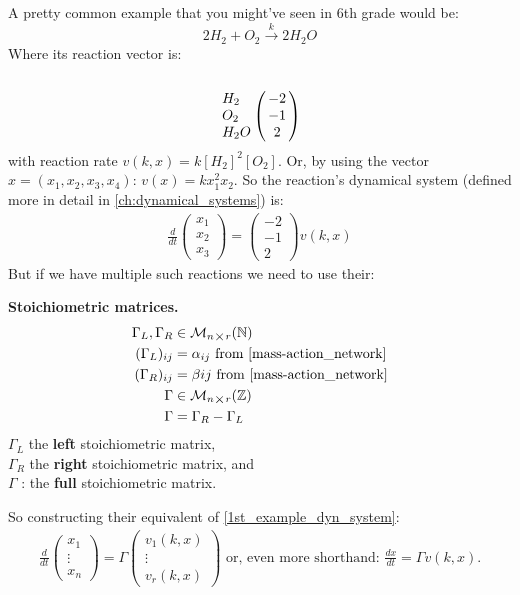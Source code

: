 A pretty common example that you might've seen in 6th grade would be:
\[
	2H_2 + O_2 \xrightarrow{k} 2H_2O
\]
Where its reaction vector is:
\[
	\bordermatrix{\cr \cr
		H_2 & -2 \cr
		O_2 & -1 \cr
		H_2O & 2 \cr
	}
\]
with reaction rate $v(k,x) = k[H_2]^2[O_2]$. Or, by using the vector $x=(x_1, x_2, x_3, x_4)$: $v(x) = k x_1^2 x_2$.
So the reaction's dynamical system (defined more in detail in \ref{ch:dynamical_systems}) is:
\begin{align}\label{1st_example_dyn_system}
	\frac{d}{dt}
	\begin{pmatrix*}
		x_1 \\
		x_2 \\
		x_3
	\end{pmatrix*} =
	\begin{pmatrix}
		-2 \\
		-1 \\
		2
	\end{pmatrix}
	v(k,x)
\end{align}
But if we have multiple such reactions we need to use their:
\begin{definition}
	\textbf{Stoichiometric matrices.}
	\begin{align*}
		\Gamma_L, \Gamma_R &\in \mathcal{M}_{n \bigtimes r}(\mathbb{N}) \\
		(\Gamma_L)_{ij} &= \alpha_{ij} \text{ from \ref{mass-action_network}} \\
		(\Gamma_R)_{ij} &= \beta{ij} \text{ from \ref{mass-action_network}} \\
		\Gamma &\in \mathcal{M}_{n \bigtimes r}(\mathbb{Z}) \\
		\Gamma &= \Gamma_R - \Gamma_L
	\end{align*}
	$\Gamma_L$ the \textbf{left} stoichiometric matrix, \\
	$\Gamma_R$ the \textbf{right} stoichiometric matrix, and \\
	$\Gamma$ : the \textbf{full} stoichiometric matrix.
\end{definition}
So constructing their equivalent of \ref{1st_example_dyn_system}:
\begin{align}\label{crn_system_matrix_form}
	\frac{d}{dt}
	\begin{pmatrix*}
		x_1 \\
		\vdots \\
		x_n
	\end{pmatrix*} = \Gamma
	\begin{pmatrix*}
		v_1(k,x)	 \\
		\vdots \\
		v_r(k,x)
	\end{pmatrix*}
	\text{ or, even more shorthand:  }
	\frac{dx}{dt} = \Gamma v(k,x).
\end{align}

